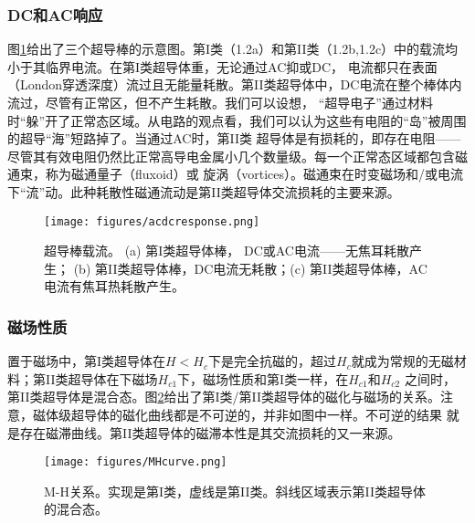 \subsubsection{DC和AC响应}
图\ref{acdccurrent}给出了三个超导棒的示意图。第I类（1.2a）和第II类（1.2b,1.2c）中的载流均小于其临界电流。在第I类超导体重，无论通过AC抑或DC，
电流都只在表面（London穿透深度）流过且无能量耗散。第II类超导体中，DC电流在整个棒体内流过，尽管有正常区，但不产生耗散。我们可以设想，
“超导电子”通过材料时“躲”开了正常态区域。从电路的观点看，我们可以认为这些有电阻的“岛”被周围的超导“海”短路掉了。当通过AC时，第II类
超导体是有损耗的，即存在电阻——尽管其有效电阻仍然比正常高导电金属小几个数量级。每一个正常态区域都包含磁通束，称为磁通量子（fluxoid）或
旋涡（vortices）。磁通束在时变磁场和/或电流下“流”动。此种耗散性磁通流动是第II类超导体交流损耗的主要来源。

\begin{figure}
  \centering
 \texttt{[image: figures/acdcresponse.png]}
  \caption{
超导棒载流。 (a) 第I类超导体棒， DC或AC电流——无焦耳耗散产生；
 (b) 第II类超导体棒，DC电流无耗散；(c) 第II类超导体棒，AC电流有焦耳热耗散产生。}\label{acdccurrent}
\end{figure}

\subsubsection{磁场性质}
置于磁场中，第I类超导体在$H<H_c$下是完全抗磁的，超过$H_c$就成为常规的无磁材料；第II类超导体在下磁场$H_{c1}$下，磁场性质和第I类一样，在$H_{c1}$和$H_{c2}$
之间时，第II类超导体是混合态。图\ref{mhcurve}给出了第I类/第II类超导体的磁化与磁场的关系。注意，磁体级超导体的磁化曲线都是不可逆的，并非如图中一样。不可逆的结果
就是存在磁滞曲线。第II类超导体的磁滞本性是其交流损耗的又一来源。

\begin{figure}
  \centering
 \texttt{[image: figures/MHcurve.png]}
  \caption{
M-H关系。实现是第I类，虚线是第II类。斜线区域表示第II类超导体的混合态。
}\label{mhcurve}
\end{figure}


